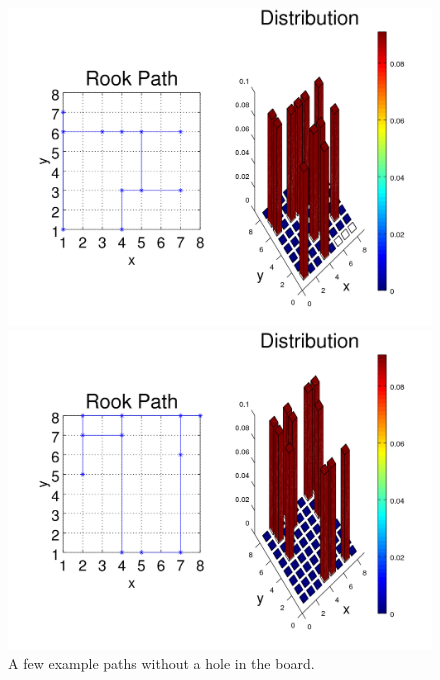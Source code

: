 \documentclass{amsart}
\numberwithin{equation}{section}
\begin{document}
\begin{figure}[!h]
   \begin{minipage}{0.50\textwidth}
     \centering
     \includegraphics[width=1.0\linewidth]{figures/regular/figure_Rook_path_n10_x4_y1.png}
     \captionsetup*{labelformat=empty}
     \caption{$n=10$}
   \end{minipage}\hfil
   \begin{minipage}{0.50\textwidth}
     \centering
     \includegraphics[width=1.0\linewidth]{figures/regular/figure_Rook_path_n10_x8_y8.png}
     \captionsetup{labelformat=empty}
     \caption*{$n=10$}
    \end{minipage}\hfil
    \caption{A few example paths without a hole in the board.}
    \label{plots:graphs_paths_regular}
\end{figure}
\end{document}
